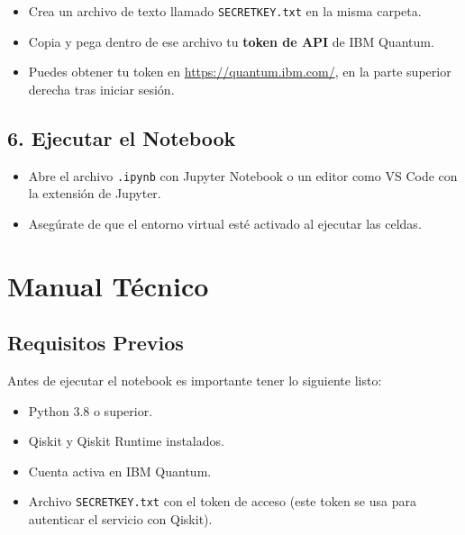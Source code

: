 \documentclass{article}
\begin{document}
\begin{itemize}
    \item Crea un archivo de texto llamado \texttt{SECRETKEY.txt} en la misma carpeta.
    \item Copia y pega dentro de ese archivo tu \textbf{token de API} de IBM Quantum.
    \item Puedes obtener tu token en \url{https://quantum.ibm.com/}, en la parte superior 
          derecha tras iniciar sesión.
\end{itemize}

\subsection*{6. Ejecutar el Notebook}

\begin{itemize}
    \item Abre el archivo \texttt{.ipynb} con Jupyter Notebook o un editor como VS Code con 
          la extensión de Jupyter.
    \item Asegúrate de que el entorno virtual esté activado al ejecutar las celdas.
\end{itemize}




\section{Manual Técnico}\label{sec:man_t}


\subsection*{Requisitos Previos}

Antes de ejecutar el notebook es importante tener lo siguiente listo:

\begin{itemize}
    \item Python 3.8 o superior.
    \item Qiskit y Qiskit Runtime instalados.
    \item Cuenta activa en IBM Quantum.
    \item Archivo \texttt{SECRETKEY.txt} con el token de acceso 
            (este token se usa para autenticar el servicio con Qiskit).
\end{itemize}
\end{document}
